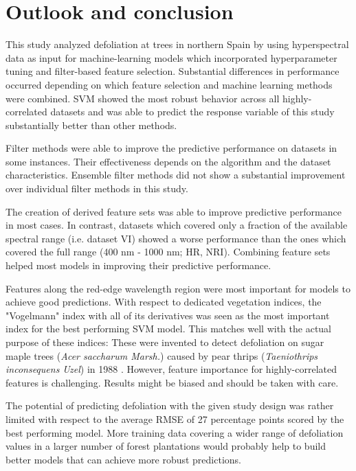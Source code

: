\documentclass[letterpaper, peerreview, draftcls]{IEEEtran}
\begin{document}
\section{Outlook and conclusion}
This study analyzed defoliation at trees in northern Spain by using hyperspectral data as input for machine-learning models which incorporated hyperparameter tuning and filter-based feature selection.
Substantial differences in performance occurred depending on which feature selection and machine learning methods were combined.
SVM showed the most robust behavior across all highly-correlated datasets and was able to predict the response variable of this study substantially better than other methods.

Filter methods were able to improve the predictive performance on datasets in some instances.
Their effectiveness depends on the algorithm and the dataset characteristics.
Ensemble filter methods did not show a substantial improvement over individual filter methods in this study.

The creation of derived feature sets was able to improve predictive performance in most cases.
In contrast, datasets which covered only a fraction of the available spectral range (i.e. dataset VI) showed a worse performance than the ones which covered the full range (400 nm - 1000 nm; HR, NRI).
Combining feature sets helped most models in improving their predictive performance.

Features along the red-edge wavelength region were most important for models to achieve good predictions.
With respect to dedicated vegetation indices, the "Vogelmann" index with all of its derivatives was seen as the most important index for the best performing SVM model.
This matches well with the actual purpose of these indices: 
These were invented to detect defoliation on sugar maple trees (\textit{Acer saccharum Marsh.}) caused by pear thrips (\textit{Taeniothrips inconsequens Uzel}) in 1988 \cite{vogelmann1993}.
However, feature importance for highly-correlated features is challenging.
Results might be biased and should be taken with care.

The potential of predicting defoliation with the given study design was rather limited with respect to the average RMSE of 27 percentage points scored by the best performing model.
More training data covering a wider range of defoliation values in a larger number of forest plantations would probably help to build better models that can achieve more robust predictions.
\end{document}
